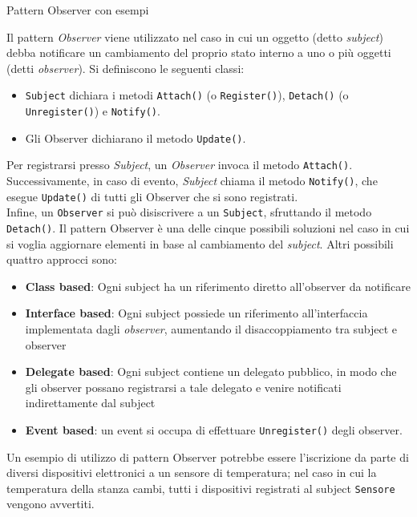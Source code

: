 \begin{problem}{1.18}
Pattern Observer con esempi
\end{problem}
\begin{solution}
Il pattern \textit{Observer} viene utilizzato nel caso in cui un oggetto (detto \textit{subject}) debba notificare un cambiamento del proprio stato interno a uno o più oggetti (detti \textit{observer}).
Si definiscono le seguenti classi:
\begin{itemize}
	\item \texttt{Subject} dichiara i metodi \texttt{Attach()} (o \texttt{Register()}), \texttt{Detach()} (o
	\texttt{Unregister()}) e \texttt{Notify()}.
	\item Gli Observer dichiarano il metodo \texttt{Update()}.
\end{itemize}
Per registrarsi presso \textit{Subject}, un \textit{Observer} invoca il metodo \texttt{Attach()}.
Successivamente, in caso di evento, \textit{Subject} chiama il metodo \texttt{Notify()}, che esegue \texttt{Update()} di tutti gli Observer che si sono registrati.
\\Infine, un \texttt{Observer} si può disiscrivere a un \texttt{Subject}, sfruttando il metodo \texttt{Detach()}.
\newline
Il pattern Observer è una delle cinque possibili soluzioni nel caso in cui si voglia aggiornare elementi in base al cambiamento del \textit{subject}.
Altri possibili quattro approcci sono:
\begin{itemize}
	\item \textbf{Class based}: Ogni subject ha un riferimento diretto all'observer da notificare
	\item \textbf{Interface based}: Ogni subject possiede un riferimento all'interfaccia implementata dagli \textit{observer}, aumentando il disaccoppiamento tra subject e observer
	\item \textbf{Delegate based}: Ogni subject contiene un delegato pubblico, in modo che gli observer possano registrarsi a tale delegato e venire notificati indirettamente dal subject
	\item \textbf{Event based}: un event si occupa di effettuare \texttt{Unregister()} degli observer.
\end{itemize}
Un esempio di utilizzo di pattern Observer potrebbe essere l'iscrizione da parte di diversi dispositivi elettronici a un sensore di temperatura; nel caso in cui la temperatura della stanza cambi, tutti i dispositivi registrati al subject \texttt{Sensore} vengono avvertiti.
\newline

\end{solution}
